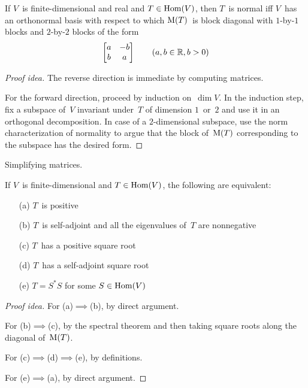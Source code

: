 \begin{thm}
If \(V\)~is finite-dimensional and real and \(T\in\operatorname{Hom}(V)\), then \(T\)~is normal iff \(V\)~has an orthonormal basis with respect to which \(\operatorname{M}(T)\)~is block diagonal with \(1\)-by-\(1\) blocks and \(2\)-by-\(2\) blocks of the form
\[\left[\begin{matrix}a&-b\\b&a\end{matrix}\right]\qquad(a,b\in\mathbb{R},b>0)\]
\end{thm}
\begin{proof}[Proof idea]
The reverse direction is immediate by computing matrices.

For the forward direction, proceed by induction on~\(\dim V\). In the induction step, fix a subspace of~\(V\) invariant under~\(T\) of dimension \(1\)~or~\(2\) and use it in an orthogonal decomposition. In case of a \(2\)-dimensional subspace, use the norm characterization of normality to argue that the block of~\(\operatorname{M}(T)\) corresponding to the subspace has the desired form.
\end{proof}
\begin{app}
Simplifying matrices.
\end{app}

\begin{thm}
If \(V\)~is finite-dimensional and \(T\in\operatorname{Hom}(V)\), the following are equivalent:
\begin{enumerate}[itemsep=0pt]
\item[(a)] \(T\)~is positive
\item[(b)] \(T\)~is self-adjoint and all the eigenvalues of~\(T\) are nonnegative
\item[(c)] \(T\)~has a positive square root
\item[(d)] \(T\)~has a self-adjoint square root
\item[(e)] \(T=S^*S\) for some \(S\in\operatorname{Hom}(V)\)
\end{enumerate}
\end{thm}
\begin{proof}[Proof idea]
For (a)\(\implies\)(b), by direct argument.

For (b)\(\implies\)(c), by the spectral theorem and then taking square roots along the diagonal of~\(\operatorname{M}(T)\).

For (c)\(\implies\)(d)\(\implies\)(e), by definitions.

For (e)\(\implies\)(a), by direct argument.
\end{proof}


